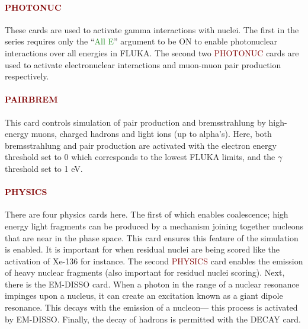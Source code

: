 \paragraph{\textcolor{Maroon}{PHOTONUC}}
These cards are used to activate gamma interactions with nuclei. The first in the series requires only the ``\textcolor{ForestGreen}{All E}'' argument to be ON to enable photonuclear interactions over all energies in FLUKA. The second two \textcolor{Maroon}{PHOTONUC} cards are used to activate electronuclear interactions and muon-muon pair production respectively.

\paragraph{\textcolor{Maroon}{PAIRBREM}}
This card controls simulation of pair production and bremsstrahlung by high-energy muons, charged hadrons and light ions (up to alpha's). Here, both bremsstrahlung and pair production are activated with the electron energy threshold set to 0 which corresponds to the lowest FLUKA limits, and the $\gamma$ threshold set to 1 eV.

\paragraph{\textcolor{Maroon}{PHYSICS}}
There are four physics cards here. The first of which enables coalescence; high energy light fragments can be produced by a mechanism joining together nucleons that are near in the phase space. This card ensures this feature of the simulation is enabled. It is important for when residual nuclei are being scored like the activation of Xe-136 for instance. The second \textcolor{Maroon}{PHYSICS} card enables the emission of heavy nuclear fragments (also important for residucl nuclei scoring). Next, there is the EM-DISSO card. When a photon in the range of a nuclear resonance impinges upon a nucleus, it can create an excitation known as a giant dipole resonance. This decays with the emission of a nucleon— this process is activated by EM-DISSO. Finally, the decay of hadrons is permitted with the DECAY card.